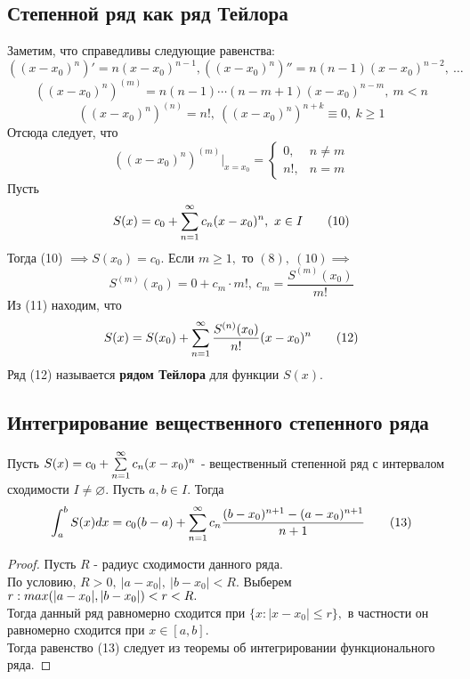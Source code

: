 \documentclass[main]{subfiles}
\begin{document}
\subsection{Степенной ряд как ряд Тейлора}
Заметим, что справедливы следующие равенства:
\[ ((x-x_0)^n)'=n(x-x_0)^{n-1}, ((x-x_0)^n)''=n(n-1)(x-x_0)^{n-2},\ \dots \]
\[ ((x-x_0)^n)^{(m)}=n(n-1)\cdots(n-m+1)(x-x_0)^{n-m},\ m<n \]
\[ ((x-x_0)^n)^{(n)}=n!,\ ((x-x_0)^n)^{n+k}\equiv 0,\ k\geq 1 \]
Отсюда следует, что \[ ((x-x_0)^n)^{(m)}|_{x=x_0}=\begin{cases}
   0,& n\ne m
   \\
   n!,& n=m
   \end{cases}\tag{9} \]
Пусть \[ S(x)=c_0+\sum\limits_{n=1}^\infty c_n(x-x_0)^n,\ x\in I\tag{10} \]
Тогда (10) $\implies S(x_0)=c_0.$ Если $m\geq 1,$ то $(8),\ (10)\implies$ \[ S^{(m)}(x_0)=0+c_m\cdot m!,\  c_m=\frac{S^{(m)}(x_0)}{m!}\tag{11} \]
Из (11) находим, что \[ S(x)=S(x_0)+\sum\limits_{n=1}^\infty \frac{S^{(n)}(x_0)}{n!}(x-x_0)^n\tag{12} \]
Ряд (12) называется \textbf{рядом Тейлора} для функции $S(x).$

\subsection{Интегрирование вещественного степенного ряда}
\begin{theorem}
     Пусть $S(x)=c_0+\sum\limits_{n=1}^\infty c_n(x-x_0)^n$ - вещественный степенной ряд с интервалом сходимости $I\ne\varnothing.$ Пусть $a,b\in I.$ Тогда 
\[ \int_a^b S(x)dx=c_0(b-a)+\sum\limits_{n=1}^\infty c_n\frac{(b-x_0)^{n+1}-(a-x_0)^{n+1}}{n+1}\tag{13} \]
\end{theorem}
\begin{proof} Пусть $R$ - радиус сходимости данного ряда.\\
По условию, $R>0,\ |a-x_0|,\ |b-x_0|<R$. Выберем $r:\\ max(|a-x_0|,|b-x_0|)<r<R.$\\
Тогда данный ряд равномерно сходится при $\{ x:|x-x_0|\leq r\},$ в частности он равномерно сходится при $x\in [a,b].$\\
Тогда равенство (13) следует из теоремы об интегрировании функционального ряда.
\end{proof}
\end{document}
